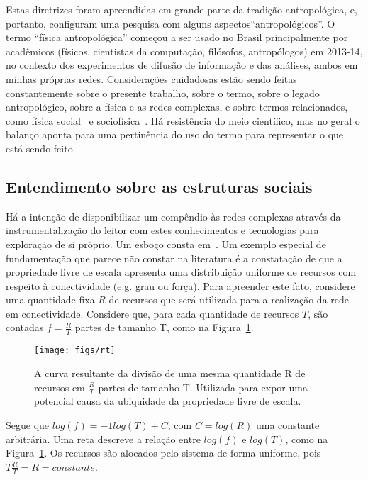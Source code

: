 \documentclass[a4paper,openright,12pt]{report} %
\begin{document}
Estas diretrizes foram apreendidas em grande parte da tradição antropológica,
e, portanto, configuram uma pesquisa com alguns aspectos``antropológicos''.
O termo ``física antropológica'' começou a ser usado no Brasil principalmente por
acadêmicos (físicos, cientistas da computação, filósofos, antropólogos) em 2013-14,
no contexto dos experimentos de difusão de informação e das análises, ambos em minhas próprias redes.
Considerações cuidadosas estão sendo feitas constantemente sobre o presente trabalho, 
sobre o termo, sobre o legado antropológico,
sobre a física e as redes complexas, e sobre termos relacionados, 
como física social~\cite{pentland2} e sociofísica~\cite{socioF}.
Há resistência do meio científico, mas no geral o balanço aponta para uma pertinência do uso do termo
para representar o que está sendo feito.

\subsection{Entendimento sobre as estruturas sociais}\label{sec:com}
Há a intenção de disponibilizar um compêndio às redes complexas
através da instrumentalização do leitor com estes conhecimentos e tecnologias
para exploração de si próprio. Um esboço
consta em~\cite{gradus}.
Um exemplo especial de fundamentação que parece não 
constar na literatura é a constatação de que
a propriedade livre de escala apresenta uma distribuição
uniforme de recursos com respeito à conectividade (e.g. grau ou força).
Para apreender este fato, considere uma quantidade fixa $R$ de recursos
que será utilizada para a realização da rede em conectividade.
Considere que, para cada quantidade de recursos $T$, são contadas $f=\frac{R}{T}$ partes de tamanho T, como na Figura~\ref{fig:1T}.

\begin{figure}[!h]
    \centering
    \caption{ \footnotesize A curva resultante da divisão de uma mesma quantidade
    R de recursos em $\frac{R}{T}$ partes de tamanho T.
        Utilizada para expor uma potencial causa da ubiquidade da
        propriedade livre de escala.}
    \texttt{[image: figs/rt]}
    \label{fig:1T}
\end{figure}

Segue que $log(f)=-1 log(T) + C$, com $C=log(R)$ uma constante
arbitrária. Uma reta descreve a relação entre $log(f)$ e 
$log(T)$, como na Figura~\ref{fig:1T}.
Os recursos são alocados pelo sistema de forma uniforme,
pois $T\frac{R}{T}=R=constante$.
\end{document}
